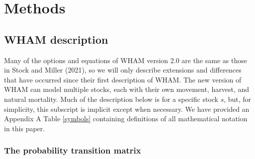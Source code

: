 \documentclass[
]{article}
\begin{document}
\hypertarget{methods}{%
\section*{Methods}\label{methods}}

\hypertarget{wham-description}{%
\subsection*{WHAM description}\label{wham-description}}

Many of the options and equations of WHAM version 2.0 are the same as those in Stock and Miller (2021), so we will only describe extensions and differences that have occurred since their first description of WHAM. The new version of WHAM can model multiple stocks, each with their own movement, harvest, and natural mortality. Much of the description below is for a specific stock \(s\), but, for simplicity, this subscript is implicit except when necessary. We have provided an Appendix A Table \ref{symbols} containing definitions of all mathematical notation in this paper.

\hypertarget{the-probability-transition-matrix}{%
\subsubsection*{The probability transition matrix}\label{the-probability-transition-matrix}}
\end{document}
